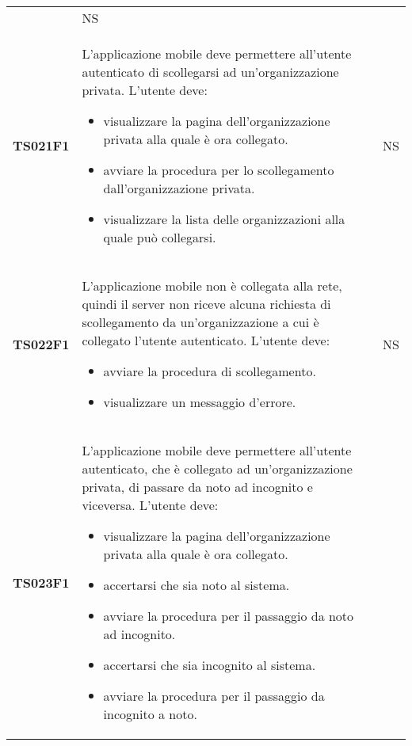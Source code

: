 \documentclass[../piano-di-qualifica.tex]{subfiles}
\begin{document}
\begin{centering}
\begin{longtable}[H]{>{\centering\bfseries}m{3cm} >{}p{10cm} >{\centering\arraybackslash}m{3cm}}
\begin{itemize}
                      \end{itemize}
                    & NS \\
        TS021F1     & L'applicazione mobile deve permettere all'utente autenticato di scollegarsi ad un'organizzazione privata. \newline
                      L'utente deve:
                      \begin{itemize}
                        \item visualizzare la pagina dell'organizzazione privata alla quale è ora collegato.
                        \item avviare la procedura per lo scollegamento dall'organizzazione privata.
                        \item visualizzare la lista delle organizzazioni alla quale può collegarsi.
                      \end{itemize}
                    & NS \\
        TS022F1     & L'applicazione mobile non è collegata alla rete, quindi il server non riceve alcuna richiesta di scollegamento da un'organizzazione a cui è collegato l'utente autenticato. \newline
                      L'utente deve:
                      \begin{itemize}
                        \item avviare la procedura di scollegamento.
                        \item visualizzare un messaggio d'errore.
                      \end{itemize}
                    & NS \\
        TS023F1     & L'applicazione mobile deve permettere all'utente autenticato, che è collegato ad un'organizzazione privata, di passare da noto ad incognito e viceversa. \newline
                      L'utente deve:
                      \begin{itemize}
                        \item visualizzare la pagina dell'organizzazione privata alla quale è ora collegato.
                        \item accertarsi che sia noto al sistema.
                        \item avviare la procedura per il passaggio da noto ad incognito.
                        \item accertarsi che sia incognito al sistema.
                        \item avviare la procedura per il passaggio da incognito a noto.

\end{itemize}
\end{longtable}
\end{centering}
\end{document}
